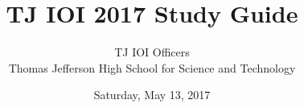 \title{
    {\LARGE TJ IOI 2017 Study Guide}
}

\author
{
	{
		\large
		TJ IOI Officers \\
		\vspace{0.5em}
		Thomas Jefferson High School for Science and Technology
	}
}
\date{{\large Saturday, May 13, 2017}}

\maketitle
